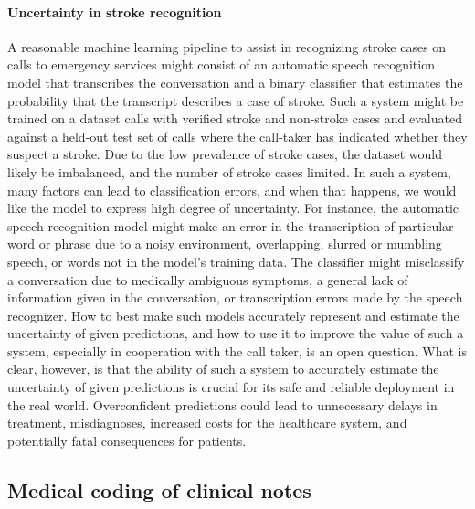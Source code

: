 \paragraph{Uncertainty in stroke recognition} A reasonable machine learning pipeline to assist in recognizing stroke cases on calls to emergency services might consist of an automatic speech recognition model that transcribes the conversation and a binary classifier that estimates the probability that the transcript describes a case of stroke. 
Such a system might be trained on a dataset calls with verified stroke and non-stroke cases and evaluated against a held-out test set of calls where the call-taker has indicated whether they suspect a stroke. Due to the low prevalence of stroke cases, the dataset would likely be imbalanced, and the number of stroke cases limited. 
In such a system, many factors can lead to classification errors, and when that happens, we would like the model to express high degree of uncertainty. 
For instance, the automatic speech recognition model might make an error in the transcription of particular word or phrase due to a noisy environment, overlapping, slurred or mumbling speech, or words not in the model's training data. 
The classifier might misclassify a conversation due to medically ambiguous symptoms, a general lack of information given in the conversation, or transcription errors made by the speech recognizer. 
How to best make such models accurately represent and estimate the uncertainty of given predictions, and how to use it to improve the value of such a system, especially in cooperation with the call taker, is an open question.
What is clear, however, is that the ability of such a system to accurately estimate the uncertainty of given predictions is crucial for its safe and reliable deployment in the real world. Overconfident predictions could lead to unnecessary delays in treatment, misdiagnoses, increased costs for the healthcare system, and potentially fatal consequences for patients.


\subsection{Medical coding of clinical notes} \label{subsec:motivation-medical-coding}
%
